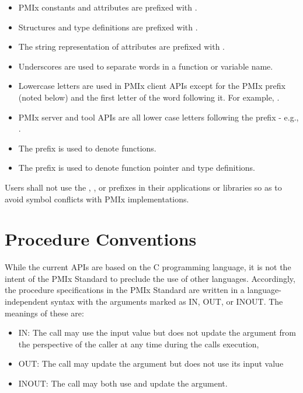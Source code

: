 \begin{itemize}
\item \ac{PMIx} constants and attributes are prefixed with \textbf{}.
\item Structures and type definitions are prefixed with .
\item The string representation of attributes are prefixed with .
\item Underscores are used to separate words in a function or variable name.
\item Lowercase letters are used in \ac{PMIx} client \acp{API} except for the \ac{PMIx} prefix (noted below) and the first letter of the word following it.
For example, .
\item \ac{PMIx} server and tool \acp{API} are all lower case letters following the prefix - e.g., .
\item The  prefix is used to denote functions.
\item The  prefix is used to denote function pointer and type definitions.
\end{itemize}

Users shall not use the \textbf{}, \textbf{}, or \textbf{} prefixes in their applications or libraries so as to avoid symbol conflicts with \ac{PMIx} implementations.

\section{Procedure Conventions}

While the current \acp{API} are based on the C programming language, it is not the intent of the \ac{PMIx} Standard to preclude the use of other languages.
Accordingly, the procedure specifications in the \ac{PMIx} Standard are written in a language-independent syntax with the arguments marked as IN, OUT, or INOUT.
The meanings of these are:
\begin{itemize}
\item IN:
The call may use the input value but does not update the argument from the perspective of the caller at any time during the calls execution,
\item OUT:
The call may update the argument but does not use its input value
\item INOUT:
The call may both use and update the argument.
\end{itemize}

